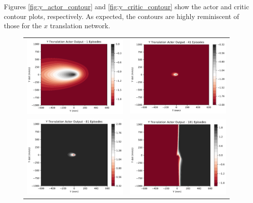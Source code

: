 Figures \ref{fig:y_actor_contour} and \ref{fig:y_critic_contour} show the actor and critic contour plots, respectively. As expected, the contours are highly reminiscent of those for the $x$ translation network.
\begin{figure}[H]
	\begin{tabular}{cc}
		\includegraphics[width=65mm]{figures/train_figs/transy_actor/Actor2_1.pdf} &  
		\includegraphics[width=65mm]{figures/train_figs/transy_actor/Actor2_41.pdf} \\
		\includegraphics[width=65mm]{figures/train_figs/transy_actor/Actor2_81.pdf} &   \includegraphics[width=65mm]{figures/train_figs/transy_actor/Actor2_181.pdf} \\

\end{tabular}
\end{figure}
